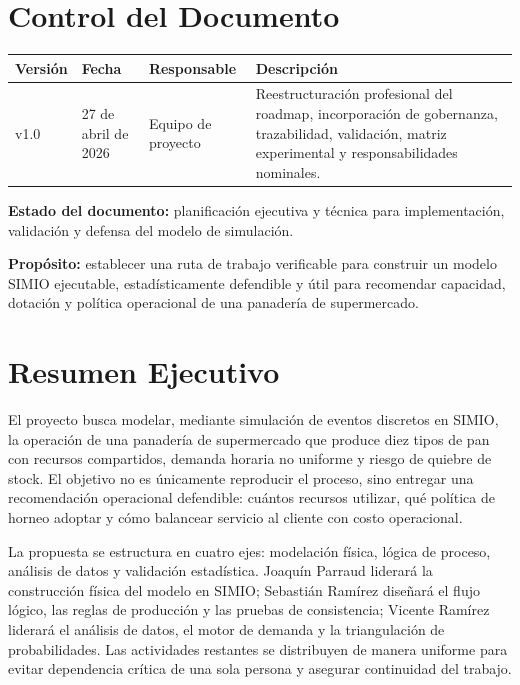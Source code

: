 \documentclass[11pt,letterpaper]{article}
\newcommand{\fechaemision}{27 de abril de 2026}
\newcommand{\versiondoc}{v1.0}
\begin{document}
\tableofcontents
\newpage

\section{Control del Documento}

\begin{tabularx}{\textwidth}{L{2.2cm}L{3.0cm}L{4.0cm}Y}
  \toprule
  \textbf{Versión} & \textbf{Fecha} & \textbf{Responsable} & \textbf{Descripción} \\
  \midrule
  \versiondoc & \fechaemision & Equipo de proyecto & Reestructuración profesional del roadmap, incorporación de gobernanza, trazabilidad, validación, matriz experimental y responsabilidades nominales. \\
  \bottomrule
\end{tabularx}

\textbf{Estado del documento:} planificación ejecutiva y técnica para implementación, validación y defensa del modelo de simulación.

\textbf{Propósito:} establecer una ruta de trabajo verificable para construir un modelo SIMIO ejecutable, estadísticamente defendible y útil para recomendar capacidad, dotación y política operacional de una panadería de supermercado.

\section{Resumen Ejecutivo}

El proyecto busca modelar, mediante simulación de eventos discretos en SIMIO, la operación de una panadería de supermercado que produce diez tipos de pan con recursos compartidos, demanda horaria no uniforme y riesgo de quiebre de stock. El objetivo no es únicamente reproducir el proceso, sino entregar una recomendación operacional defendible: cuántos recursos utilizar, qué política de horneo adoptar y cómo balancear servicio al cliente con costo operacional.

La propuesta se estructura en cuatro ejes: modelación física, lógica de proceso, análisis de datos y validación estadística. Joaquín Parraud liderará la construcción física del modelo en SIMIO; Sebastián Ramírez diseñará el flujo lógico, las reglas de producción y las pruebas de consistencia; Vicente Ramírez liderará el análisis de datos, el motor de demanda y la triangulación de probabilidades. Las actividades restantes se distribuyen de manera uniforme para evitar dependencia crítica de una sola persona y asegurar continuidad del trabajo.
\end{document}
